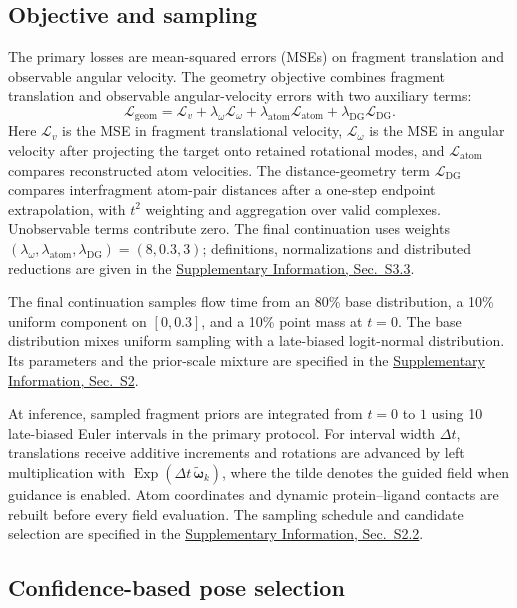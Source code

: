 \documentclass{article}
\renewcommand{\boldsymbol}[1]{\pmb{#1}}
\newcommand{\sisection}[1]{\href{SI.pdf}{Supplementary Information, Sec.~#1}}
\begin{document}
\subsection{Objective and sampling}
\label{sec:objective}
\label{sec:sampling}

The primary losses are mean-squared errors (MSEs) on fragment translation and observable angular velocity.
The geometry objective combines fragment translation and observable angular-velocity errors with two auxiliary terms:
\begin{equation}
    \mathcal{L}_{\mathrm{geom}}
    =\mathcal{L}_{v}
     +\lambda_{\omega}\mathcal{L}_{\omega}
     +\lambda_{\mathrm{atom}}\mathcal{L}_{\mathrm{atom}}
     +\lambda_{\mathrm{DG}}\mathcal{L}_{\mathrm{DG}}.
    \label{eq:geometry_objective}
\end{equation}
Here \(\mathcal L_v\) is the MSE in fragment translational velocity, \(\mathcal L_\omega\) is the MSE in angular velocity after projecting the target onto retained rotational modes, and \(\mathcal L_{\mathrm{atom}}\) compares reconstructed atom velocities. The distance-geometry term \(\mathcal L_{\mathrm{DG}}\) compares interfragment atom-pair distances after a one-step endpoint extrapolation, with \(t^2\) weighting and aggregation over valid complexes. Unobservable terms contribute zero. The final continuation uses weights \((\lambda_\omega,\lambda_{\mathrm{atom}},\lambda_{\mathrm{DG}})=(8,0.3,3)\); definitions, normalizations and distributed reductions are given in the \sisection{S3.3}.

The final continuation samples flow time from an 80\% base distribution, a 10\% uniform component on \([0,0.3]\), and a 10\% point mass at \(t=0\). The base distribution mixes uniform sampling with a late-biased logit-normal distribution. Its parameters and the prior-scale mixture are specified in the \sisection{S2}.

At inference, sampled fragment priors are integrated from \(t=0\) to \(1\) using 10 late-biased Euler intervals in the primary protocol.
For interval width \(\Delta t\), translations receive additive increments and rotations are advanced by left multiplication with \(\operatorname{Exp}(\Delta t\,\widetilde{\boldsymbol{\omega}}_k)\), where the tilde denotes the guided field when guidance is enabled.
Atom coordinates and dynamic protein--ligand contacts are rebuilt before every field evaluation.
The sampling schedule and candidate selection are specified in the \sisection{S2.2}.

\subsection{Confidence-based pose selection}
\label{sec:confidence}
\end{document}

